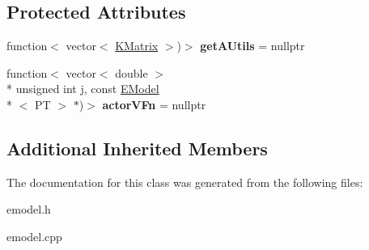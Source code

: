 \subsection*{Protected Attributes}
\begin{DoxyCompactItemize}
\item 
\hypertarget{class_k_base_1_1_e_state_acc31eed9873f571e46d369c27c08f67d}{function$<$ vector$<$ \hyperlink{class_k_base_1_1_k_matrix}{K\-Matrix} $>$)$>$ {\bfseries get\-A\-Utils} = nullptr}\label{class_k_base_1_1_e_state_acc31eed9873f571e46d369c27c08f67d}

\item 
\hypertarget{class_k_base_1_1_e_state_ac71ef963eb875e2ff6786fb78751d6eb}{function$<$ vector$<$ double $>$\\*
unsigned int j, const \hyperlink{class_k_base_1_1_e_model}{E\-Model}\\*
$<$ P\-T $>$ $\ast$)$>$ {\bfseries actor\-V\-Fn} = nullptr}\label{class_k_base_1_1_e_state_ac71ef963eb875e2ff6786fb78751d6eb}

\end{DoxyCompactItemize}
\subsection*{Additional Inherited Members}


The documentation for this class was generated from the following files\-:\begin{DoxyCompactItemize}
\item 
emodel.\-h\item 
emodel.\-cpp\end{DoxyCompactItemize}
